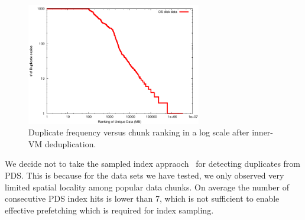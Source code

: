 \begin{figure}
\centering
 \includegraphics[width=3in]{figures/log-log-disk}
\caption{Duplicate frequency versus  chunk ranking in a log scale after inner-VM deduplication.}
\label{fig:Datazipf}
\end{figure}
We decide not to take the sampled index appraoch~\cite{Guo2011} 
for detecting duplicates from PDS.
This is because for the data sets we have tested, we only observed very limited spatial locality 
among popular data chunks. On average the number of consecutive PDS index hits is lower than 7,
which is not sufficient to enable effective prefetching which is required for index sampling.

